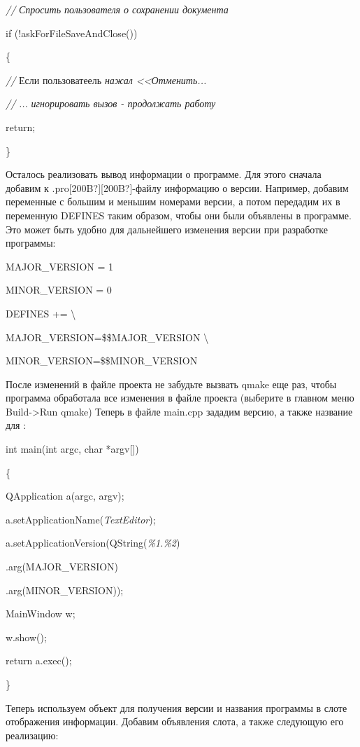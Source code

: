\textit{//} \textit{Спросить пользователя о сохранении документа}\textit{ }

if (!askForFileSaveAndClose())

\{

 \textit{//} Если пользоватеель\textit{ нажал <<Отменить...}

 \textit{//} \textit{...} \textit{игнорировать вызов - продолжать работу}\textit{ }

 return;

 \}

Осталось реализовать вывод информации о программе. Для этого сначала добавим к
.pro\textlatin{[200B?]}\textlatin{[200B?]}-файлу информацию о версии. Например, добавим переменные с большим и меньшим
номерами версии, а потом передадим их в переменную DEFINES таким образом, чтобы они
были объявлены в программе. Это может быть удобно для дальнейшего изменения версии при разработке программы: 

MAJOR\_VERSION = 1

MINOR\_VERSION = 0

DEFINES += {\textbackslash}

 MAJOR\_VERSION=\$\$MAJOR\_VERSION {\textbackslash}

 MINOR\_VERSION=\$\$MINOR\_VERSION

После изменений в файле проекта не забудьте вызвать qmake еще раз, чтобы программа обработала все изменения в файле
проекта (выберите в главном меню Build-{>}Run qmake) Теперь в файле main.cpp зададим версию, а также
название для : 

int main(int argc, char *argv[])

\{

 QApplication a(argc, argv);

 a.setApplicationName(\textit{TextEditor});

 a.setApplicationVersion(QString(\textit{\%1.\%2})

 .arg(MAJOR\_VERSION)

 .arg(MINOR\_VERSION));

 MainWindow w;

 w.show();

 return a.exec();

\}

Теперь используем объект  для получения версии и названия программы в слоте отображения информации. Добавим
объявления слота, а также следующую его реализацию: 

